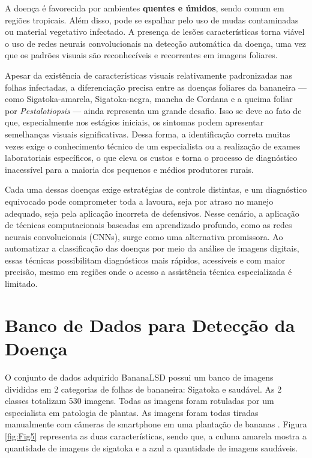 A doença é favorecida por ambientes \textbf{quentes e úmidos}, sendo comum em regiões tropicais. Além disso, pode se espalhar pelo uso de mudas contaminadas ou material vegetativo infectado. A presença de lesões características torna viável o uso de redes neurais convolucionais na detecção automática da doença, uma vez que os padrões visuais são reconhecíveis e recorrentes em imagens foliares.



Apesar da existência de características visuais relativamente padronizadas nas folhas infectadas, a diferenciação precisa entre as doenças foliares da bananeira — como Sigatoka-amarela, Sigatoka-negra, mancha de Cordana e a queima foliar por \textit{Pestalotiopsis} — ainda representa um grande desafio. Isso se deve ao fato de que, especialmente nos estágios iniciais, os sintomas podem apresentar semelhanças visuais significativas. Dessa forma, a identificação correta muitas vezes exige o conhecimento técnico de um especialista ou a realização de exames laboratoriais específicos, o que eleva os custos e torna o processo de diagnóstico inacessível para a maioria dos pequenos e médios produtores rurais.

Cada uma dessas doenças exige estratégias de controle distintas, e um diagnóstico equivocado pode comprometer toda a lavoura, seja por atraso no manejo adequado, seja pela aplicação incorreta de defensivos. Nesse cenário, a aplicação de técnicas computacionais baseadas em aprendizado profundo, como as redes neurais convolucionais (CNNs), surge como uma alternativa promissora. Ao automatizar a classificação das doenças por meio da análise de imagens digitais, essas técnicas possibilitam diagnósticos mais rápidos, acessíveis e com maior precisão, mesmo em regiões onde o acesso a assistência técnica especializada é limitado.



\section{Banco de Dados para Detecção da Doença}


O conjunto de dados adquirido \ac{BananaLSD} possui um banco de imagens divididas em 2 categorias de folhas de bananeira: Sigatoka e saudável. As 2 classes totalizam 530 imagens. Todas as imagens foram rotuladas por um especialista em  patologia de plantas. As imagens foram todas tiradas manualmente com câmeras de smartphone em uma plantação de bananas \cite{DadosArt}. Figura \ref{fig:Fig5} representa as duas características, sendo que, a culuna amarela mostra a quantidade de imagens de sigatoka e a azul a quantidade de imagens saudáveis.  

